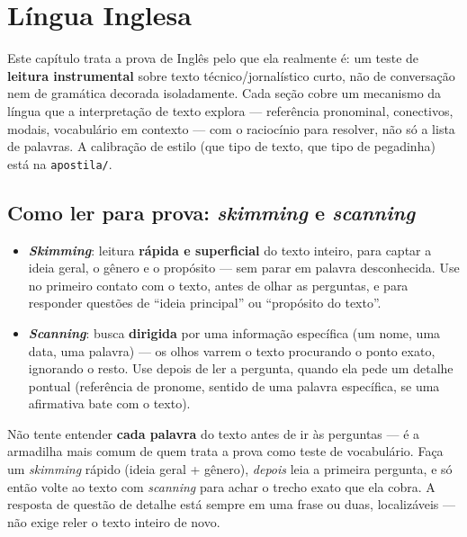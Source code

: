 \chapter{Língua Inglesa}
\label{cap:ingles-teoria}

Este capítulo trata a prova de Inglês pelo que ela realmente é: um teste de
\textbf{leitura instrumental} sobre texto técnico/jornalístico curto, não de
conversação nem de gramática decorada isoladamente. Cada seção cobre um
mecanismo da língua que a interpretação de texto explora --- referência
pronominal, conectivos, modais, vocabulário em contexto --- com o raciocínio
para resolver, não só a lista de palavras. A calibração de estilo (que tipo
de texto, que tipo de pegadinha) está na \texttt{apostila/}.

\section{Como ler para prova: \textit{skimming} e \textit{scanning}}

\begin{conceito}
\begin{itemize}
\item \textbf{\textit{Skimming}}: leitura \textbf{rápida e superficial} do
texto inteiro, para captar a ideia geral, o gênero e o propósito --- sem
parar em palavra desconhecida. Use no primeiro contato com o texto, antes
de olhar as perguntas, e para responder questões de “ideia principal” ou
“propósito do texto”.
\item \textbf{\textit{Scanning}}: busca \textbf{dirigida} por uma
informação específica (um nome, uma data, uma palavra) --- os olhos varrem
o texto procurando o ponto exato, ignorando o resto. Use depois de ler a
pergunta, quando ela pede um detalhe pontual (referência de pronome,
sentido de uma palavra específica, se uma afirmativa bate com o texto).
\end{itemize}
\end{conceito}

\begin{regrapratica}
Não tente entender \textbf{cada palavra} do texto antes de ir às perguntas
--- é a armadilha mais comum de quem trata a prova como teste de
vocabulário. Faça um \textit{skimming} rápido (ideia geral + gênero), \emph{
depois} leia a primeira pergunta, e só então volte ao texto com
\textit{scanning} para achar o trecho exato que ela cobra. A resposta de
questão de detalhe está sempre em uma frase ou duas, localizáveis --- não
exige reler o texto inteiro de novo.
\end{regrapratica}


